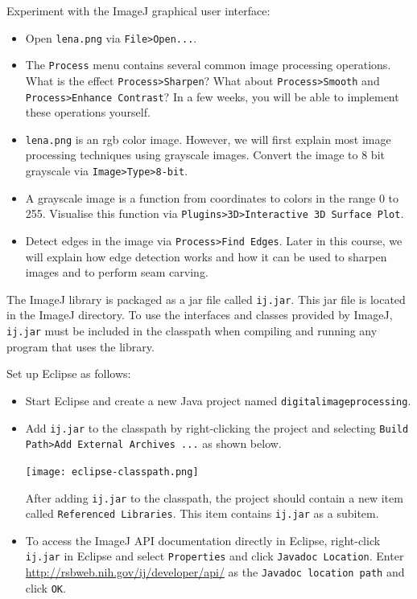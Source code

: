 \documentclass{book}
\begin{document}
\begin{exercise}
Experiment with the ImageJ graphical user interface:
\begin{itemize}
  \item Open \texttt{lena.png} via \texttt{File>Open...}.
  \item The \texttt{Process} menu contains several common image processing operations. What is the effect \texttt{Process>Sharpen}? What about \texttt{Process>Smooth} and \texttt{Process>Enhance Contrast}? In a few weeks, you will be able to implement these operations yourself. 
  \item \texttt{lena.png} is an rgb color image. However, we will first explain most image processing techniques using grayscale images. Convert the image to 8 bit grayscale via \texttt{Image>Type>8-bit}.
  \item A grayscale image is a function from coordinates to colors in the range 0 to 255. Visualise this function via  \texttt{Plugins>3D>Interactive 3D Surface Plot}. 
  \item Detect edges in the image via \texttt{Process>Find Edges}. Later in this course, we will explain how edge detection works and how it can be used to sharpen images and to perform seam carving.
\end{itemize} 
\end{exercise}

The ImageJ library is packaged as a jar file called \texttt{ij.jar}. This jar file is located in the ImageJ directory. To use the interfaces and classes provided by ImageJ, \texttt{ij.jar} must be included in the classpath when compiling and running any program that uses the library. 

\begin{exercise}
Set up Eclipse as follows:
\begin{itemize}
  \item Start Eclipse and create a new Java project named \texttt{digitalimageprocessing}.
  \item Add \texttt{ij.jar} to the classpath by right-clicking the project and selecting \texttt{Build Path>Add External Archives ...} as shown below.
  \begin{center}
  \texttt{[image: eclipse-classpath.png]}
  \end{center}
  After adding \texttt{ij.jar} to the classpath, the project should contain a new item called \texttt{Referenced Libraries}. This item contains \texttt{ij.jar} as a subitem. 
  \item To access the ImageJ API documentation directly in Eclipse, right-click \texttt{ij.jar} in Eclipse and select \texttt{Properties} and click \texttt{Javadoc Location}. Enter \href{http://rsbweb.nih.gov/ij/developer/api/}{http://rsbweb.nih.gov/ij/developer/api/} as the \texttt{Javadoc location path} and click \texttt{OK}.  
\end{itemize}
\end{exercise}
\end{document}
